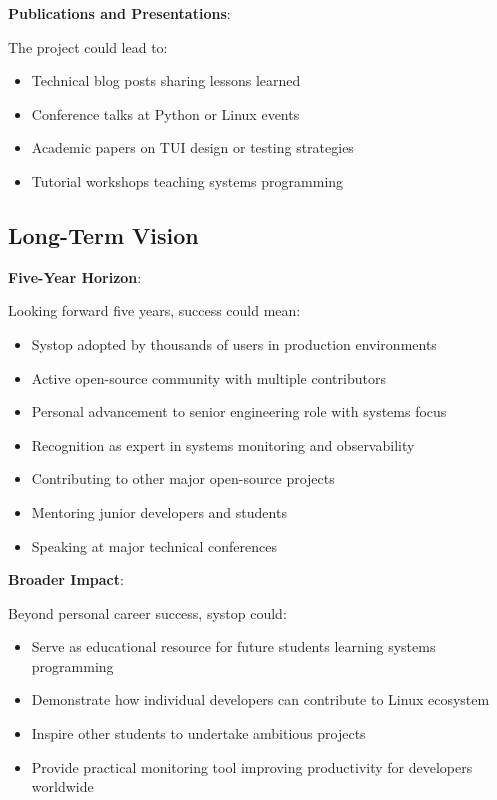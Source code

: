 \documentclass[12pt,a4paper,oneside]{report}
\begin{document}
\textbf{Publications and Presentations}:

The project could lead to:
\begin{itemize}
    \item Technical blog posts sharing lessons learned
    \item Conference talks at Python or Linux events
    \item Academic papers on TUI design or testing strategies
    \item Tutorial workshops teaching systems programming
\end{itemize}

\subsection{Long-Term Vision}

\textbf{Five-Year Horizon}:

Looking forward five years, success could mean:

\begin{itemize}
    \item Systop adopted by thousands of users in production environments
    \item Active open-source community with multiple contributors
    \item Personal advancement to senior engineering role with systems focus
    \item Recognition as expert in systems monitoring and observability
    \item Contributing to other major open-source projects
    \item Mentoring junior developers and students
    \item Speaking at major technical conferences
\end{itemize}

\textbf{Broader Impact}:

Beyond personal career success, systop could:

\begin{itemize}
    \item Serve as educational resource for future students learning systems programming
    \item Demonstrate how individual developers can contribute to Linux ecosystem
    \item Inspire other students to undertake ambitious projects
    \item Provide practical monitoring tool improving productivity for developers worldwide
\end{itemize}
\end{document}

